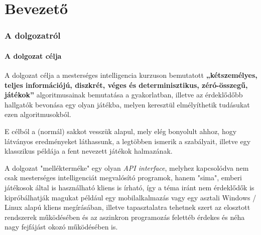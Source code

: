 \documentclass[twoside, a4paper, 12pt]{article}
\begin{document}
\part{Bevezető}
\section{A dolgozatról}
\subsection{A dolgozat célja}
A dolgozat célja a mesterséges intelligencia kurzuson bemutatott \textbf{„kétszemélyes, teljes információjú, diszkrét, véges és determinisztikus, zéró-összegű, játékok”} algoritmusainak bemutatása a gyakorlatban, illetve az érdeklődőbb hallgatók bevonása egy olyan játékba, melyen keresztül elmélyíthetik tudásukat ezen algoritmusokból.

E célból a (normál) sakkot vesszük alapul, mely elég bonyolult ahhoz, hogy látványos eredményeket láthassunk, a legtöbben ismerik a szabályait, illetve egy klasszikus példája a fent nevezett játékok halmazának.

A dolgozat "mellékterméke" egy olyan \textit{API interface}, melyhez kapcsolódva nem csak mesterséges intelligenciát megvalósító programok, hanem "sima", emberi játékosok által is használható kliens is írható, így a téma iránt nem érdeklődők is kipróbálhatják magukat például egy mobilalkalmazás vagy egy asztali Windows / Linux alapú kliens megírásában, illetve tapasztalatra tehetnek szert az elosztott rendszerek működésében és az aszinkron programozás felettéb érdekes és néha nagy fejfájást okozó működésében is.
\end{document}
